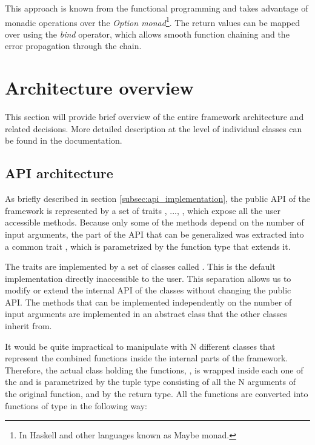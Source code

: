 This approach is known from the functional programming and takes advantage of monadic operations over the \textit{Option monad}\footnote{In Haskell and other languages known as Maybe monad.}. The return values can be mapped over using the \textit{bind} operator, which allows smooth function chaining and the error propagation through the chain.

\section{Architecture overview}

This section will provide brief overview of the entire framework architecture and related decisions. More detailed description at the level of individual classes can be found in the documentation.

\subsection{API architecture}

As briefly described in section \ref{subsec:api_implementation}, the public API of the framework is represented by a set of traits , ..., , which expose all the user accessible methods. Because only some of the methods depend on the number of input arguments, the part of the API that can be generalized was extracted into a common trait , which is parametrized by the function type that extends it. 

The  traits are implemented by a set of classes called . This is the default implementation directly inaccessible to the user. This separation allows us to modify or extend the internal API of the  classes without changing the public API. The methods that can be implemented independently on the number of input arguments are implemented in an abstract class  that the other classes inherit from.

It would be quite impractical to manipulate with N different classes that represent the combined functions inside the internal parts of the framework. Therefore, the actual class holding the functions, , is wrapped inside each one of the  and is parametrized by the tuple type consisting of all the N arguments of the original function, and by the return type. All the functions are converted into functions of type  in the following way:


